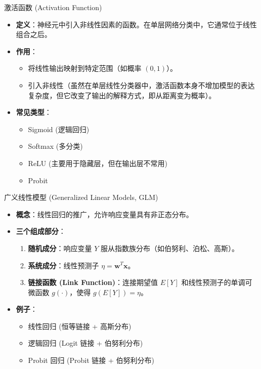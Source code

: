 \documentclass[12pt, aspectratio=169]{beamer}
\newcommand{\vect}[1]{\mathbf{#1}}
\begin{document}
\begin{frame}{激活函数 (Activation Function)}
    \begin{itemize}
        \item \textbf{定义}：神经元中引入非线性因素的函数。在单层网络分类中，它通常位于线性组合之后。
        \item \textbf{作用}：
        \begin{itemize}
            \item 将线性输出映射到特定范围（如概率 $(0,1)$）。
            \item 引入非线性（虽然在单层线性分类器中，激活函数本身不增加模型的表达复杂度，但它改变了输出的解释方式，即从距离变为概率）。
        \end{itemize}
        \item \textbf{常见类型}：
        \begin{itemize}
            \item Sigmoid (逻辑回归)
            \item Softmax (多分类)
            \item ReLU (主要用于隐藏层，但在输出层不常用)
            \item Probit
        \end{itemize}
    \end{itemize}
\end{frame}

\begin{frame}{广义线性模型 (Generalized Linear Models, GLM)}
    \begin{itemize}
        \item \textbf{概念}：线性回归的推广，允许响应变量具有非正态分布。
        \item \textbf{三个组成部分}：
        \begin{enumerate}
            \item \textbf{随机成分}：响应变量 $Y$ 服从指数族分布（如伯努利、泊松、高斯）。
            \item \textbf{系统成分}：线性预测子 $\eta = \vect{w}^T \vect{x}$。
            \item \textbf{链接函数 (Link Function)}：连接期望值 $E[Y]$ 和线性预测子的单调可微函数 $g(\cdot)$，使得 $g(E[Y]) = \eta$。
        \end{enumerate}
        \item \textbf{例子}：
        \begin{itemize}
            \item 线性回归 (恒等链接 + 高斯分布)
            \item 逻辑回归 (Logit 链接 + 伯努利分布)
            \item Probit 回归 (Probit 链接 + 伯努利分布)
        \end{itemize}
    \end{itemize}
\end{frame}
\end{document}
